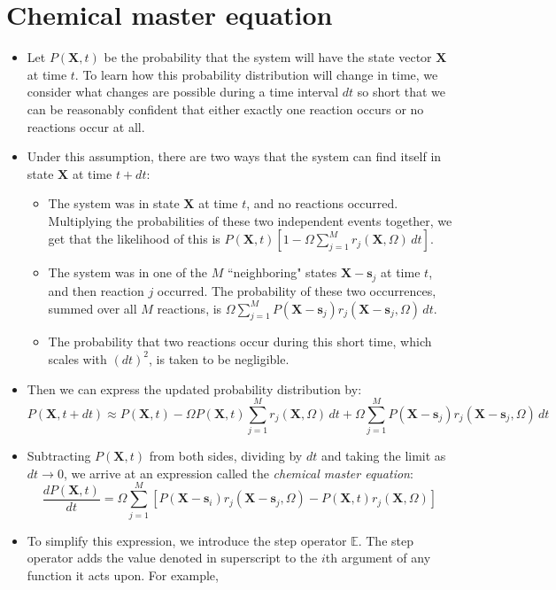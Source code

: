 \documentclass{article}
\begin{document}
\section*{Chemical master equation}
\begin{itemize}
\item Let $P(\mathbf{X},t)$ be the probability that the system will have the state vector $\mathbf{X}$ at time $t$.  To learn how this probability distribution will change in time, we consider what changes are possible during a time interval $dt$ so short that we can be reasonably confident that either exactly one reaction occurs or no reactions occur at all.
\item Under this assumption, there are two ways that the system can find itself in state $\mathbf{X}$ at time $t+dt$:
\begin{itemize}
\item The system was in state $\mathbf{X}$ at time $t$, and no reactions occurred. Multiplying the probabilities of these two independent events together, we get that the likelihood of this is $P(\mathbf{X},t) \left[ 1 - \Omega \sum_{j=1}^M r_j(\mathbf{X}, \Omega) \, dt \right]$.
\item The system was in one of the $M$ ``neighboring" states $\mathbf{X} - \mathbf{s}_j$ at time $t$, and then reaction $j$ occurred. The probability of these two occurrences, summed over all $M$ reactions, is $\Omega \sum_{j=1}^M P(\mathbf{X} - \mathbf{s}_j) r_j (\mathbf{X} - \mathbf{s}_j,\Omega) \, dt$.
\item The probability that two reactions occur during this short time, which scales with $(dt)^2$, is taken to be negligible.
\end{itemize}
\item Then we can express the updated probability distribution by:
\[ P(\mathbf{X},t+dt) \approx P(\mathbf{X},t)  - \Omega P(\mathbf{X},t)  \sum_{j=1}^M r_j(\mathbf{X},\Omega) \, dt  + \Omega \sum_{j=1}^M P(\mathbf{X} - \mathbf{s}_j) r_j (\mathbf{X} - \mathbf{s}_j, \Omega) \, dt \]
\item Subtracting $P(\mathbf{X},t)$ from both sides, dividing by $dt$ and taking the limit as $dt \to 0$, we arrive at an expression called the \textit{chemical master equation}:
\[ \frac{dP(\mathbf{X},t)}{dt} =   \Omega \sum_{j=1}^M \left[ P(\mathbf{X} - \mathbf{s}_i) r_j (\mathbf{X} - \mathbf{s}_j, \Omega)  - P(\mathbf{X},t) r_j(\mathbf{X}, \Omega)  \right] \]
\item To simplify this expression, we introduce the step operator $\mathbb{E}$. The step operator adds the value denoted in superscript to the $i$th argument of any function it acts upon. For example,

\end{itemize}
\end{document}
